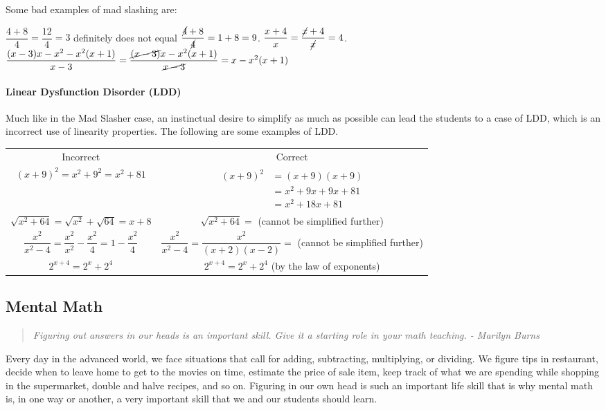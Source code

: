 Some bad examples of mad slashing are:
\begin{example}
\Item $\dfrac{4+8}{4}=\dfrac{12}{4}=3$ definitely does not equal $\dfrac{\cancel{4}+8}{\cancel{4}}=1+8=9$.
\Item $\dfrac{x+4}{x}=\dfrac{\cancel{x}+4}{\cancel{x}}=4$.
\Item $\dfrac{(x-3)x-x^2-x^2(x+1)}{x-3}=\dfrac{\cancel{(x-3)}x-x^2(x+1)}{\cancel{x-3}}=x-x^2(x+1)$
\end{example}
\paragraph*{Linear Dysfunction Disorder (LDD)}
Much like in the Mad Slasher case, an instinctual desire to simplify as much as
possible can lead the students to a case of LDD, which is an incorrect use of linearity
properties. The following are some examples of LDD.
{\setlength{\abovedisplayskip}{-12pt}
\begin{center}
\begin{tabular}[t]{cc}
Incorrect & Correct\\
$(x+9)^2=x^2+9^2=x^2+81$ &
\parbox[t][]{0.3\textwidth}{
\begin{align*}
(x+9)^2&=(x+9)(x+9)\\
			&=x^2+9x+9x+81\\
			&=x^2+18x+81
\end{align*}
}\\
$\sqrt{x^2+64}=\sqrt{x^2}+\sqrt{64}=x+8$ & $\sqrt{x^2+64}=$ (cannot be simplified further)\\
$\dfrac{x^2}{x^2-4}=\dfrac{x^2}{x^2}-\dfrac{x^2}{4}=1-\dfrac{x^2}{4}$ & $\dfrac{x^2}{x^2-4}=\dfrac{x^2}{(x+2)(x-2)}=$ (cannot be simplified further)\\
$2^{x+4}=2^x+2^4$ & $2^{x+4}=2^x+2^4$ (by the law of exponents)\\
\end{tabular}
\end{center}}

\subsection*{Mental Math}
\begin{quote}
\textit{Figuring out answers in our heads is an important skill. Give it a starting role in your math
teaching. - Marilyn Burns}
\end{quote}

Every day in the advanced world, we face situations that call for adding, subtracting,
multiplying, or dividing. We figure tips in restaurant, decide when to leave home to get to the
movies on time, estimate the price of sale item, keep track of what we are spending while shopping
in the supermarket, double and halve recipes, and so on. Figuring in our own head is such an
important life skill that is why mental math is, in one way or another, a very important skill that we
and our students should learn.

